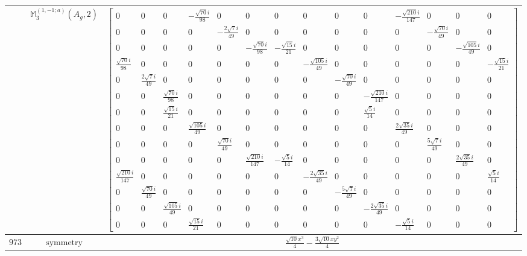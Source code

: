\documentclass[fleqn,8pt,landscape]{jsarticle}
\begin{document}
\begin{longtable}{ccc}
$  $ & $ \mathbb{M}_{3}^{(1,-1;a)}(A_{g},2) $ & $ \begin{bmatrix} 0 & 0 & 0 & - \frac{\sqrt{70} i}{98} & 0 & 0 & 0 & 0 & 0 & 0 & - \frac{\sqrt{210} i}{147} & 0 & 0 & 0 \\ 0 & 0 & 0 & 0 & - \frac{2 \sqrt{7} i}{49} & 0 & 0 & 0 & 0 & 0 & 0 & - \frac{\sqrt{70} i}{49} & 0 & 0 \\ 0 & 0 & 0 & 0 & 0 & - \frac{\sqrt{70} i}{98} & - \frac{\sqrt{15} i}{21} & 0 & 0 & 0 & 0 & 0 & - \frac{\sqrt{105} i}{49} & 0 \\ \frac{\sqrt{70} i}{98} & 0 & 0 & 0 & 0 & 0 & 0 & - \frac{\sqrt{105} i}{49} & 0 & 0 & 0 & 0 & 0 & - \frac{\sqrt{15} i}{21} \\ 0 & \frac{2 \sqrt{7} i}{49} & 0 & 0 & 0 & 0 & 0 & 0 & - \frac{\sqrt{70} i}{49} & 0 & 0 & 0 & 0 & 0 \\ 0 & 0 & \frac{\sqrt{70} i}{98} & 0 & 0 & 0 & 0 & 0 & 0 & - \frac{\sqrt{210} i}{147} & 0 & 0 & 0 & 0 \\ 0 & 0 & \frac{\sqrt{15} i}{21} & 0 & 0 & 0 & 0 & 0 & 0 & \frac{\sqrt{5} i}{14} & 0 & 0 & 0 & 0 \\ 0 & 0 & 0 & \frac{\sqrt{105} i}{49} & 0 & 0 & 0 & 0 & 0 & 0 & \frac{2 \sqrt{35} i}{49} & 0 & 0 & 0 \\ 0 & 0 & 0 & 0 & \frac{\sqrt{70} i}{49} & 0 & 0 & 0 & 0 & 0 & 0 & \frac{5 \sqrt{7} i}{49} & 0 & 0 \\ 0 & 0 & 0 & 0 & 0 & \frac{\sqrt{210} i}{147} & - \frac{\sqrt{5} i}{14} & 0 & 0 & 0 & 0 & 0 & \frac{2 \sqrt{35} i}{49} & 0 \\ \frac{\sqrt{210} i}{147} & 0 & 0 & 0 & 0 & 0 & 0 & - \frac{2 \sqrt{35} i}{49} & 0 & 0 & 0 & 0 & 0 & \frac{\sqrt{5} i}{14} \\ 0 & \frac{\sqrt{70} i}{49} & 0 & 0 & 0 & 0 & 0 & 0 & - \frac{5 \sqrt{7} i}{49} & 0 & 0 & 0 & 0 & 0 \\ 0 & 0 & \frac{\sqrt{105} i}{49} & 0 & 0 & 0 & 0 & 0 & 0 & - \frac{2 \sqrt{35} i}{49} & 0 & 0 & 0 & 0 \\ 0 & 0 & 0 & \frac{\sqrt{15} i}{21} & 0 & 0 & 0 & 0 & 0 & 0 & - \frac{\sqrt{5} i}{14} & 0 & 0 & 0 \end{bmatrix} $ \\ \hline
$ 973 $ & $ \text{symmetry} $ & $ \frac{\sqrt{10} x^{3}}{4} - \frac{3 \sqrt{10} x y^{2}}{4} $ \\

\end{longtable}
\end{document}
